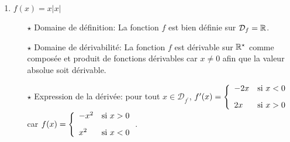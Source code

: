 \documentclass[a4paper, 11pt,reqno]{article}
\begin{document}
\begin{correction}
\begin{enumerate}
\begin{itemize}
		      \end{itemize}
		\item  $f(x)=x|x|$\\
		      \begin{itemize}
			      \item[$\star$] Domaine de d\'efinition: La fonction $f$ est bien d\'efinie sur $\mathcal{D}_f=\mathbb{R}$.
			      \item[$\star$] Domaine de d\'erivabilit\'e: La fonction $f$ est d\'erivable sur $\mathbb{R}^{\star}$ comme compos\'ee et produit de fonctions d\'erivables car $x\not= 0$ afin que la valeur absolue soit d\'erivable.
			      \item[$\star$] Expression de la d\'eriv\'ee: pour tout $x\in\mathcal{D}_{f^{\prime}}$, $f^{\prime}(x)=\left\lbrace\begin{array}{ll}
					            -2x & \hbox{si}\ x<0\vsec \\
					            2x  & \hbox{si}\ x>0
				            \end{array}\right.$ car $f(x)=\left\lbrace\begin{array}{ll}
					            -x^2 & \hbox{si}\ x>0 \vsec \\
					            x^2  & \hbox{si}\ x<0
				            \end{array}\right.$.
		      \end{itemize}
	\end{enumerate}
\end{correction}
\end{document}
